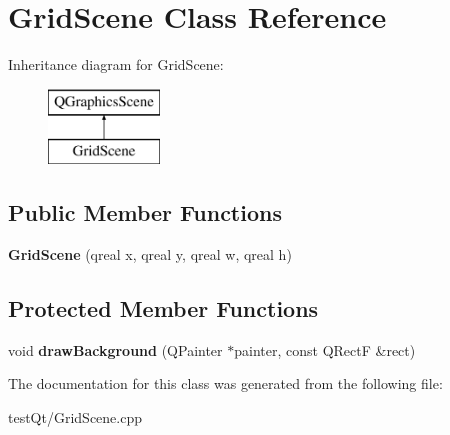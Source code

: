 \hypertarget{class_grid_scene}{}\section{Grid\+Scene Class Reference}
\label{class_grid_scene}
Inheritance diagram for Grid\+Scene\+:\begin{figure}[H]
\begin{center}
\leavevmode
\includegraphics[height=2.000000cm]{class_grid_scene}
\end{center}
\end{figure}
\subsection*{Public Member Functions}
\begin{DoxyCompactItemize}
\item 
\hypertarget{class_grid_scene_a862e773b698ef7af7569c2c7fb8d30f4}{}\label{class_grid_scene_a862e773b698ef7af7569c2c7fb8d30f4} 
{\bfseries Grid\+Scene} (qreal x, qreal y, qreal w, qreal h)
\end{DoxyCompactItemize}
\subsection*{Protected Member Functions}
\begin{DoxyCompactItemize}
\item 
\hypertarget{class_grid_scene_a35c5f90bbf2f0ada9312b0097960c5ee}{}\label{class_grid_scene_a35c5f90bbf2f0ada9312b0097960c5ee} 
void {\bfseries draw\+Background} (Q\+Painter $\ast$painter, const Q\+RectF \&rect)
\end{DoxyCompactItemize}


The documentation for this class was generated from the following file\+:\begin{DoxyCompactItemize}
\item 
test\+Qt/Grid\+Scene.\+cpp\end{DoxyCompactItemize}
